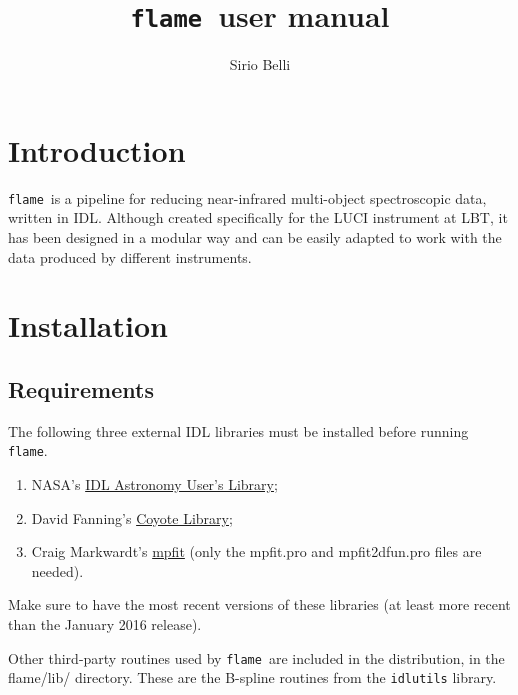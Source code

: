 \documentclass[a4paper, notitlepage]{article}
\newcommand{\flame}{\texttt{flame}}
\begin{document}
\title{\flame\ user manual}
\author{Sirio Belli}
\maketitle





\section{Introduction}

\flame\ is a pipeline for reducing near-infrared multi-object spectroscopic data, written in IDL. Although created specifically for the LUCI instrument at LBT, it has been designed in a modular way and can be easily adapted to work with the data produced by different instruments.





\section{Installation}

\subsection{Requirements}

The following three external IDL libraries must be installed before running \flame.
\begin{enumerate}
\item NASA's \href{http://idlastro.gsfc.nasa.gov/}{IDL Astronomy User's Library};
\item David Fanning's \href{http://www.idlcoyote.com/code_tips/installcoyote.php}{Coyote Library};
\item Craig Markwardt's \href{https://www.physics.wisc.edu/~craigm/idl/fitting.html}{mpfit} (only the mpfit.pro and mpfit2dfun.pro files are needed). 
\end{enumerate}
Make sure to have the most recent versions of these libraries (at least more recent than the January 2016 release).

Other third-party routines used by \flame\ are included in the distribution, in the flame/lib/ directory. These are the B-spline routines from the \texttt{idlutils} library.
\end{document}
